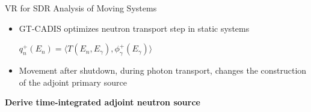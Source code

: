 \documentclass{beamer}
\begin{document}
%
\begin{frame}{VR for SDR Analysis of Moving Systems}
	\begin{itemize}
		\item{GT-CADIS optimizes neutron transport step in static
			systems}
			\begin{center}
	$q^{+}_n(E_n) = \langle T(E_n, E_{\gamma}) ,
	\phi_{\gamma}^{+}(E_{\gamma}) \rangle$
			\end{center}
			\vspace{0.5cm}
		\item{Movement after shutdown, during photon transport, changes the construction
			of the adjoint primary source}
	\end{itemize}
	\vspace{1cm}
	\centering
		{\textbf{Derive time-integrated adjoint neutron source}}

\end{frame}
\end{document}
